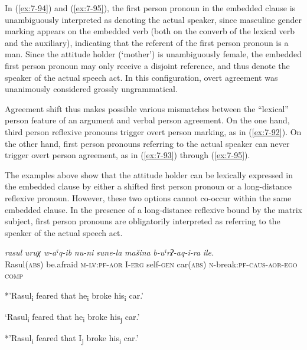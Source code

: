 ﻿\documentclass[output=paper]{langsci/langscibook}
\begin{document}
In (\ref{ex:7-94}) and (\ref{ex:7-95}), the first person pronoun in the embedded clause is
unambiguously interpreted as denoting the actual speaker, since
masculine gender marking appears on the embedded verb (both on the
converb of the lexical verb and the auxiliary), indicating that the
referent of the first person pronoun is a man. Since the attitude holder
(`mother') is unambiguously female, the embedded first person pronoun
may only receive a disjoint reference, and thus denote the speaker of
the actual speech act. In this configuration, overt agreement was
unanimously considered grossly ungrammatical.


Agreement shift thus makes possible various mismatches between the
``lexical'' person feature of an argument and verbal person agreement.
On the one hand, third person reflexive pronouns trigger overt person
marking, as in (\ref{ex:7-92}). On the other hand, first person pronouns referring
to the actual speaker can never trigger overt person agreement, as in
(\ref{ex:7-93}) through (\ref{ex:7-95}).

The examples above show that the attitude holder can be lexically
expressed in the embedded clause by either a shifted first person
pronoun or a long-distance reflexive pronoun. However, these two options
cannot co-occur within the same embedded clause. In the presence of a
long-distance reflexive bound by the matrix subject, first person
pronouns are obligatorily interpreted as referring to the speaker of the
actual speech act.

\ea\label{ex:7-96}
\gll \emph{rasul} \emph{uruχ} \emph{w-aˤq-ib} \emph{nu-ni} \emph{sune-la} \emph{mašina} \emph{b-uˤrʡ-aq-i-ra} \emph{ile.}\\
Rasul(\textsc{abs}) be.afraid \textsc{m}-\textsc{lv}:\textsc{pf}-\textsc{aor} I-\textsc{erg} self-\textsc{gen} car(\textsc{abs}) \textsc{n}-break:\textsc{pf}-\textsc{caus}-\textsc{aor}-\textsc{ego} \textsc{comp}\\

\begin{xlist}
 *'Rasul\textsubscript{i} feared that he\textsubscript{i} broke
his\textsubscript{i} car.'

 `Rasul\textsubscript{i} feared that he\textsubscript{i} broke
his\textsubscript{j} car.'

 *'Rasul\textsubscript{i} feared that I\textsubscript{j} broke
his\textsubscript{i} car.'
\end{xlist}
\z
\end{document}
